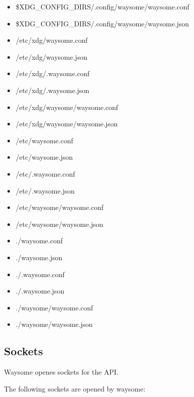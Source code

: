 \begin{itemize}
        \item \$XDG_CONFIG_DIRS/.config/waysome/waysome.conf
        \item \$XDG_CONFIG_DIRS/.config/waysome/waysome.json
        \item /etc/xdg/waysome.conf
        \item /etc/xdg/waysome.json
        \item /etc/xdg/.waysome.conf
        \item /etc/xdg/.waysome.json
        \item /etc/xdg/waysome/waysome.conf
        \item /etc/xdg/waysome/waysome.json
        \item /etc/waysome.conf
        \item /etc/waysome.json
        \item /etc/.waysome.conf
        \item /etc/.waysome.json
        \item /etc/waysome/waysome.conf
        \item /etc/waysome/waysome.json
        \item ./waysome.conf
        \item ./waysome.json
        \item ./.waysome.conf
        \item ./.waysome.json
        \item ./waysome/waysome.conf
        \item ./waysome/waysome.json
    \end{itemize}

\subsection{Sockets}

    Waysome openes sockets for the API.

    The following sockets are opened by waysome:


